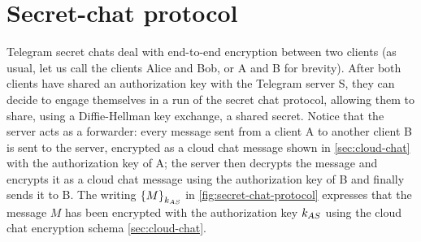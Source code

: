 \section{Secret-chat protocol}
\label{sec:secret-chat}

Telegram secret chats deal with end-to-end encryption between two clients (as usual, let us call the clients Alice and Bob, or A and B for brevity). After both clients have shared an authorization key with the Telegram server S, they can decide to engage themselves in a run of the secret chat protocol, allowing them to share, using a Diffie-Hellman key exchange, a shared secret. Notice that the server acts as a forwarder: every message sent from a client A to another client B is sent to the server, encrypted as a cloud chat message shown in \cref{sec:cloud-chat} with the authorization key of A; the server then decrypts the message and encrypts it as a cloud chat message using the authorization key of B and finally sends it to B. The writing $\left\{M\right\}_{k_{AS}}$ in \cref{fig:secret-chat-protocol} expresses that the message $M$ has been encrypted with the authorization key $k_{AS}$ using the cloud chat encryption schema \cref{sec:cloud-chat}.

